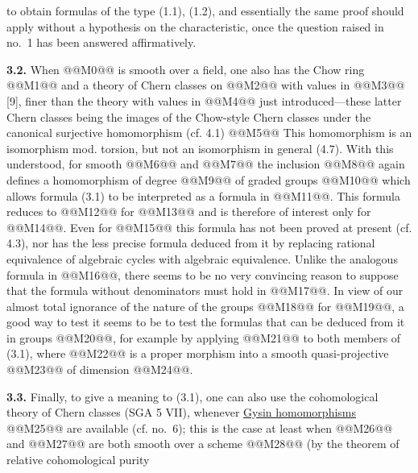 to obtain formulas of the type (1.1), (1.2), and essentially the same proof should apply without a hypothesis on the characteristic, once the question raised in no.~1 has been answered affirmatively.

\textbf{3.2.} When @@M0@@ is smooth over a field, one also has the Chow ring
@@M1@@
and a theory of Chern classes on @@M2@@ with values in @@M3@@ [9], finer than the theory with values in @@M4@@ just introduced---these latter Chern classes being the images of the Chow-style Chern classes under the canonical surjective homomorphism (cf. 4.1)
@@M5@@
This homomorphism is an isomorphism mod. torsion, but not an isomorphism in general (4.7). With this understood, for smooth @@M6@@ and @@M7@@ the inclusion @@M8@@ again defines a homomorphism of degree @@M9@@ of graded groups
@@M10@@
which allows formula (3.1) to be interpreted as a formula in @@M11@@. This formula reduces to @@M12@@ for @@M13@@ and is therefore of interest only for @@M14@@. Even for @@M15@@ this formula has not been proved at present (cf. 4.3), nor has the less precise formula deduced from it by replacing rational equivalence of algebraic cycles with algebraic equivalence. Unlike the analogous formula in @@M16@@, there seems to be no very convincing reason to suppose that the formula without denominators must hold in @@M17@@. In view of our almost total ignorance of the nature of the groups @@M18@@ for @@M19@@, a good way to test it seems to be to test the formulas that can be deduced from it in groups @@M20@@, for example by applying @@M21@@ to both members of (3.1), where @@M22@@ is a proper morphism into a smooth quasi-projective @@M23@@ of dimension @@M24@@.

\textbf{3.3.} Finally, to give a meaning to (3.1), one can also use the cohomological theory of Chern classes (SGA 5 VII), whenever \uline{Gysin homomorphisms}
@@M25@@
are available (cf. no.~6); this is the case at least when @@M26@@ and @@M27@@ are both smooth over a scheme @@M28@@ (by the theorem of relative cohomological purity
